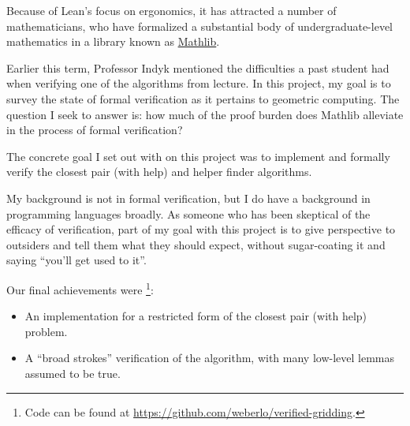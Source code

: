 \documentclass{article}
\begin{document}
Because of Lean's focus on ergonomics, it has attracted a number of mathematicians, who have formalized a substantial body of undergraduate-level mathematics in a library known as \href{https://leanprover-community.github.io}{Mathlib}.




Earlier this term, Professor Indyk mentioned the difficulties a past student had when verifying one of the algorithms from lecture.
In this project, my goal is to survey the state of formal verification as it pertains to geometric computing.
The question I seek to answer is: how much of the proof burden does Mathlib alleviate in the process of formal verification?


The concrete goal I set out with on this project was to implement and formally verify the closest pair (with help) and helper finder algorithms.

My background is not in formal verification, but I do have a background in programming languages broadly.
As someone who has been skeptical of the efficacy of verification, part of my goal with this project is to give perspective to outsiders and tell them what they should expect, without sugar-coating it and saying ``you'll get used to it''.

Our final achievements were
\footnote{
  Code can be found at \href{https://github.com/weberlo/verified-gridding}{https://github.com/weberlo/verified-gridding}.
}:
\begin{itemize}
  \item An implementation for a restricted form of the closest pair (with help) problem.
  \item A ``broad strokes'' verification of the algorithm, with many low-level lemmas assumed to be true.
\end{itemize}
\end{document}
